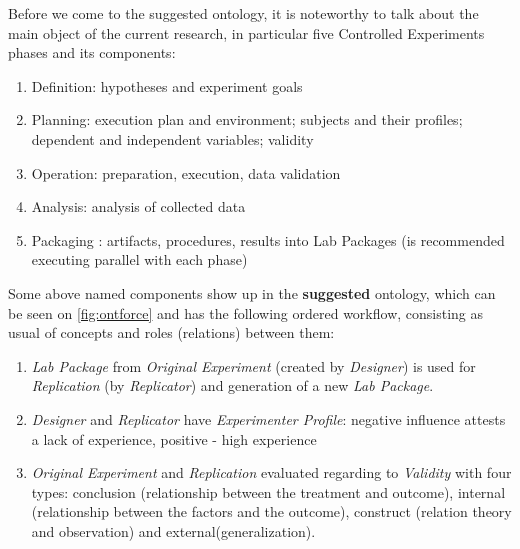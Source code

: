 	Before we come to the suggested ontology, it is noteworthy to talk about the main object of the current research, in particular five Controlled Experiments phases and its components\cite{Woh00}: 
	\begin{enumerate}
		\item Definition: hypotheses and experiment goals
		\item Planning: execution plan and environment; subjects and their profiles; dependent and independent variables; validity 
		\item Operation: preparation, execution, data validation
		\item Analysis: analysis of collected data
		\item Packaging : artifacts, procedures, results into Lab Packages (is recommended executing parallel with each phase)
	\end{enumerate}    
	Some above named components show up in the \textbf{suggested} ontology, which can be seen on \autoref{fig:ontforce} and has the following ordered workflow, consisting as usual of concepts and roles (relations) between them: 
	\begin{enumerate}
		\item \textit{Lab Package} from \textit{Original Experiment} (created by \textit{Designer}) is used for \textit{Replication} (by \textit{Replicator}) and generation of a new \textit{Lab Package}.
		\item \textit{Designer} and \textit{Replicator} have \textit{Experimenter Profile}: negative influence attests a lack of experience, positive - high experience
		\item \textit{Original Experiment} and \textit{Replication} evaluated regarding to \textit{Validity} with four types: conclusion (relationship between the treatment and outcome), internal (relationship between the factors and the outcome), construct (relation theory and observation) and external(generalization).	
	\end{enumerate}

